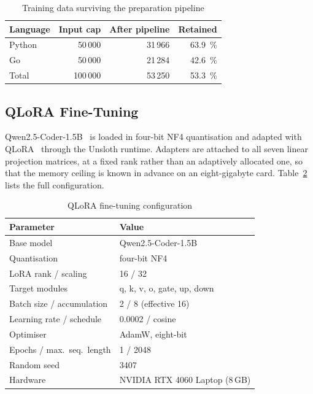 \documentclass[10pt,conference,a4paper]{IEEEtran}
\begin{document}
\begin{table}[b]
\caption{Training data surviving the preparation pipeline}
\label{tab:data}
\centering
\footnotesize
\begin{tabular}{@{}lrrr@{}}
\toprule
\textbf{Language} & \textbf{Input cap} & \textbf{After pipeline} & \textbf{Retained}\\
\midrule
Python & 50\,000  & 31\,966 & 63.9~\%\\
Go     & 50\,000  & 21\,284 & 42.6~\%\\
\midrule
Total  & 100\,000 & 53\,250 & 53.3~\%\\
\bottomrule
\end{tabular}
\end{table}

\subsection{QLoRA Fine-Tuning}
Qwen2.5-Coder-1.5B~\cite{hui2024} is loaded in four-bit NF4 quantisation and
adapted with QLoRA~\cite{dettmers2023} through the Unsloth runtime. Adapters
are attached to all seven linear projection matrices, at a fixed rank rather
than an adaptively allocated one, so that the memory ceiling is known in
advance on an eight-gigabyte card. Table~\ref{tab:config} lists the full
configuration.

\begin{table}[b]
\caption{QLoRA fine-tuning configuration}
\label{tab:config}
\centering
\footnotesize
\begin{tabular}{@{}ll@{}}
\toprule
\textbf{Parameter} & \textbf{Value}\\
\midrule
Base model                & Qwen2.5-Coder-1.5B\\
Quantisation              & four-bit NF4\\
LoRA rank / scaling       & 16 / 32\\
Target modules            & q, k, v, o, gate, up, down\\
Batch size / accumulation & 2 / 8 (effective 16)\\
Learning rate / schedule  & 0.0002 / cosine\\
Optimiser                 & AdamW, eight-bit\\
Epochs / max.\ seq.\ length & 1 / 2048\\
Random seed               & 3407\\
Hardware                  & NVIDIA RTX 4060 Laptop (8\,GB)\\
\bottomrule
\end{tabular}
\end{table}
\end{document}
